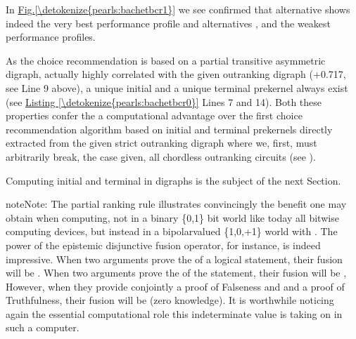 \documentclass[a4paper,12pt,english]{sphinxhowto}
\begin{document}
\sphinxAtStartPar
In \hyperref[\detokenize{pearls:bachetbcr1}]{Fig.\@ \ref{\detokenize{pearls:bachetbcr1}}} we see confirmed that alternative  shows indeed the very best performance profile and alternatives ,  and  the weakest performance profiles.

\sphinxAtStartPar
As the  choice recommendation is based on a partial transitive asymmetric digraph, actually highly correlated with the given outranking digraph  (+0.717, see Line 9 above), a unique initial and a unique terminal prekernel always exist (see \hyperref[\detokenize{pearls:bachetbcr0}]{Listing \ref{\detokenize{pearls:bachetbcr0}}} Lines 7 and 14). Both these properties confer the  a computational advantage over the  first choice recommendation algorithm based on initial and terminal prekernels directly extracted from the given strict outranking digraph where we, first, must arbitrarily break, the case given, all chordless outranking circuits (see ).

\sphinxAtStartPar
Computing initial and terminal  in digraphs is the subject of the next Section.

\begin{sphinxadmonition}{note}{Note:}
\sphinxAtStartPar
The partial  ranking rule illustrates convincingly the benefit one may obtain when computing, not in a binary \{0,1\} bit world like today all bit\sphinxhyphen{}wise computing devices, but instead in a bipolar\sphinxhyphen{}valued \{\sphinxhyphen{}1,0,+1\} world with . The power of the epistemic disjunctive fusion operator, for instance, is indeed impressive. When two arguments prove the  of a logical statement, their fusion will be . When two arguments prove the  of the statement, their fusion will be , However, when they provide conjointly a proof of Falseness and and a proof of Truthfulness, their fusion will be  (zero knowledge). It is worthwhile noticing again the essential computational role this indeterminate  value is taking on in such a  computer.
\end{sphinxadmonition}
\end{document}
